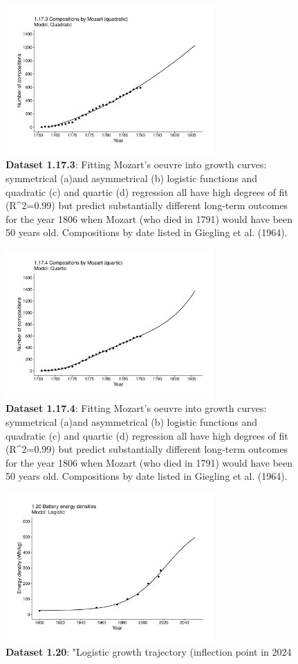 \documentclass[aps,rmp,preprint,superscriptaddress,10pt,onecolumn]{article}
\begin{document}
\begin{figure}[h]
\includegraphics[width=8cm]{output/figs-ggplot/1.17.3.pdf}
\caption{\textbf{Dataset 1.17.3}: Fitting Mozart's oeuvre into growth curves: symmetrical (a)and asymmetrical (b) logistic functions and quadratic (c) and quartic (d) regression all have high degrees of fit (R^2=0.99) but predict substantially different long-term outcomes for the year 1806 when Mozart (who died in 1791) would have been 50 years old. Compositions by date listed in Giegling et al. (1964).}
\end{figure}
	
\begin{figure}[h]
\includegraphics[width=8cm]{output/figs-ggplot/1.17.4.pdf}
\caption{\textbf{Dataset 1.17.4}: Fitting Mozart's oeuvre into growth curves: symmetrical (a)and asymmetrical (b) logistic functions and quadratic (c) and quartic (d) regression all have high degrees of fit (R^2=0.99) but predict substantially different long-term outcomes for the year 1806 when Mozart (who died in 1791) would have been 50 years old. Compositions by date listed in Giegling et al. (1964).}
\end{figure}
	
\begin{figure}[h]
\includegraphics[width=8cm]{output/figs-ggplot/1.20.pdf}
\caption{\textbf{Dataset 1.20}: "Logistic growth trajectory (inflection point in 2024}
\end{figure}
	
\end{document}
